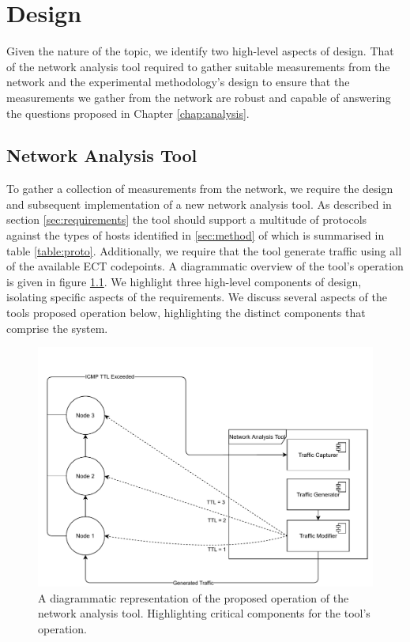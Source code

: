 \documentclass{l4proj}
\begin{document}
\chapter{Design}
\label{chap:design}

Given the nature of the topic, we identify two high-level aspects of design. That of the network analysis tool required to gather suitable measurements from the network and the experimental methodology's design to ensure that the measurements we gather from the network are robust and capable of answering the questions proposed in Chapter \ref{chap:analysis}.

\section{Network Analysis Tool}
\label{sec:tooldesign}

To gather a collection of measurements from the network, we require the design and subsequent implementation of a new network analysis tool. As described in section \ref{sec:requirements} the tool should support a multitude of protocols against the types of hosts identified in \ref{sec:method} of which is summarised in table \ref{table:proto}. Additionally, we require that the tool generate traffic using all of the available ECT codepoints. A diagrammatic overview of the tool's operation is given in figure \ref{fig:tooldesign}. We highlight three high-level components of design, isolating specific aspects of the requirements. We discuss several aspects of the tools proposed operation below, highlighting the distinct components that comprise the system.


\begin{figure}[H]
\centering
\includegraphics[width=14cm]{dissertation/images/sys_arch.pdf}
\caption{A diagrammatic representation of the proposed operation of the network analysis tool. Highlighting critical components for the tool's operation.}
\label{fig:tooldesign}
\end{figure}
\end{document}
